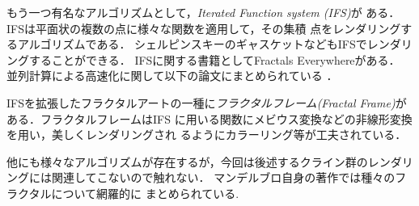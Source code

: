 もう一つ有名なアルゴリズムとして，{\it Iterated Function system (IFS)}が
ある．
IFSは平面状の複数の点に様々な関数を適用して，その集積
点をレンダリングするアルゴリズムである．
シェルピンスキーのギャスケットなどもIFSでレンダリングすることができる．
IFSに関する書籍としてFractals Everywhere\cite{fractalsEverywhere}がある．
並列計算による高速化に関して以下の論文にまとめられている
\cite{highPerformanceIFS}\cite{GPUIFS}．

IFSを拡張したフラクタルアートの一種に\emph{フラクタルフレーム}{\it(Fractal
Frame)}\cite{fractalFrame}がある．フラクタルフレームはIFS
に用いる関数にメビウス変換などの非線形変換を用い，美しくレンダリングされ
るようにカラーリング等が工夫されている．

他にも様々なアルゴリズムが存在するが，今回は後述するクライン群のレンダリ
ングには関連してこないので触れない．
マンデルブロ自身の著作\cite{fractal}では種々のフラクタルについて網羅的に
まとめられている.
